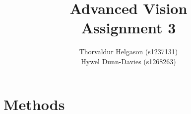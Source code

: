 \documentclass[a4paper,12pt]{article}
\title{Advanced Vision\\Assignment 3}
\author{Thorvaldur Helgason (s1237131)\\Hywel Dunn-Davies (s1268263)}
\begin{document}
    
\maketitle



\section{Methods}














\end{document}
